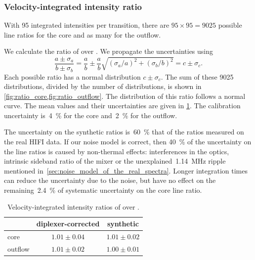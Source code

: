 \FloatBarrier
\subsubsection{Velocity-integrated intensity ratio}
\label{sec:line_ratios}
With 95 integrated intensities per transition, there are $95 \times 95 = 9025$ possible line ratios for the core and as many for the outflow.

We calculate the ratio of  over .
We propagate the uncertainties using
\begin{equation}
    \frac{a \pm \sigma_a}{b \pm \sigma_b}
    =
    \frac{a}{b} \pm \frac{a}{b}\sqrt{(\sigma_a / a)^2 + (\sigma_b / b)^2}
    = c \pm \sigma_c
    \text{.}
\end{equation}
Each possible ratio has a normal distribution $c \pm \sigma_c$.
The sum of these 9025 distributions, divided by the number of distributions, is shown in \cref{fig:ratio_core,fig:ratio_outflow}.
The distribution of this ratio follows a normal curve.
The mean values and their uncertainties are given in \cref{tab:line_ratios}.
The calibration uncertainty is~\SI{4}{\percent} for the core and~\SI{2}{\percent} for the outflow.

The uncertainty on the synthetic ratios is~\SI{60}{\percent} that of the ratios measured on the real HIFI data.
If our noise model is correct, then \SI{40}{\percent} of the uncertainty on the line ratios is caused by non-thermal effects: interferences in the optics, intrinsic sideband ratio of the mixer or the unexplained~\SI{1.14}{\mega\hertz} ripple mentioned in~\cref{sec:noise_model_of_the_real_spectra}.
Longer integration times can reduce the uncertainty due to the noise, but have no effect on the remaining~\SI{2.4}{\percent} of systematic uncertainty on the core line ratio.

\vspace{5em}
\begin{table}[h]
    \centering
    \begin{tabular}{lcc}
        \toprule
                & diplexer-corrected   & synthetic \\
        \midrule
        core    & $1.01 \pm 0.04$ & $1.01 \pm 0.02$ \\
        outflow & $1.01 \pm 0.02$ & $1.00 \pm 0.01$ \\
        \bottomrule
    \end{tabular}
    \caption{
        Velocity-integrated intensity ratios of
         over .
    }
    \label{tab:line_ratios}
\end{table}


